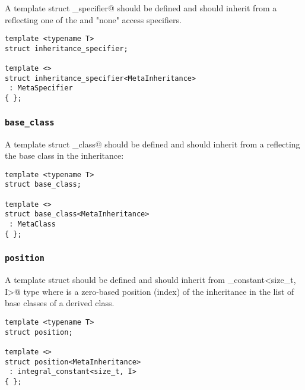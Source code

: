 A template struct \verb@inheritance_specifier@ should be defined and should inherit from
a  reflecting one of the \verb@virtual@ and "none" access specifiers.

\begin{verbatim}
template <typename T>
struct inheritance_specifier;

template <>
struct inheritance_specifier<MetaInheritance>
 : MetaSpecifier
{ };
\end{verbatim}

\subsubsection{\texttt{base\_class}}

A template struct \verb@base_class@ should be defined and should inherit from
a  reflecting the base class in the inheritance:

\begin{verbatim}
template <typename T>
struct base_class;

template <>
struct base_class<MetaInheritance>
 : MetaClass
{ };
\end{verbatim}

\subsubsection{\texttt{position}}

A template struct \verb@position@ should be defined and should
inherit from \verb@integral_constant<size_t, I>@ type where \verb@I@ is
a zero-based position (index) of the inheritance in the list of base classes
of a derived class.

\begin{verbatim}
template <typename T>
struct position;

template <>
struct position<MetaInheritance>
 : integral_constant<size_t, I>
{ };
\end{verbatim}

